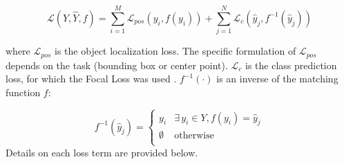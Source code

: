 \begin{equation} \label{eq:set_loss}
\mathcal{L}(Y, \hat{Y}, f ) = \sum_{i=1}^{M} \mathcal{L}_{pos}(y_i, f(y_i)) +  \sum_{j=1}^{N} \mathcal{L}_c (\hat{y}_j, f^{-1}(\hat{y}_j))
\end{equation}

where $\mathcal{L}_{pos}$ is the object localization loss. The specific formulation of $\mathcal{L}_{pos}$ depends on the task (bounding box or center point). $\mathcal{L}_c$ is the class prediction loss, for which the Focal Loss was used \cite{linFocalLossDense2018}. $f^{-1}(\cdot)$ is an inverse of the matching function $f$:

\begin{equation*}
f^{-1}(\hat{y}_j) =
\begin{cases}
y_i & \exists \, y_i \in Y, f(y_i) = \hat{y}_j \\
\emptyset & \text{otherwise} \\
\end{cases}
\end{equation*}
Details on each loss term are provided below.

